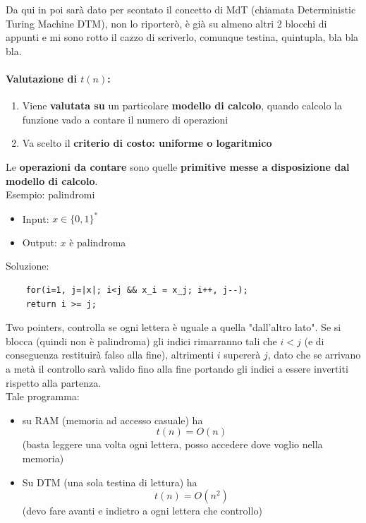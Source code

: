 Da qui in poi sarà dato per scontato il concetto di MdT (chiamata Deterministic Turing Machine DTM), non lo riporterò, è già su almeno altri 2 blocchi di appunti e mi sono rotto il cazzo di scriverlo, comunque testina, quintupla, bla bla bla.\\

\newpage

\paragraph{Valutazione di $t(n)$:}
\begin{enumerate}
	\item Viene \textbf{valutata su} un particolare \textbf{modello di calcolo}, quando calcolo la funzione vado a contare il numero di operazioni
	\item Va scelto il \textbf{criterio di costo: uniforme o logaritmico}
\end{enumerate} 

Le \textbf{operazioni da contare} sono quelle \textbf{primitive messe a disposizione dal modello di calcolo}. \\
Esempio: palindromi
\begin{itemize}
	\item Input: $x \in \{0,1\}^\ast$
	\item Output: $x$ è palindroma
\end{itemize}
Soluzione: 
\begin{lstlisting}
	for(i=1, j=|x|; i<j && x_i = x_j; i++, j--);
	return i >= j;
\end{lstlisting}

Two pointers, controlla se ogni lettera è uguale a quella "dall'altro lato". Se si blocca (quindi non è palindroma) gli indici rimarranno tali che $i < j$ (e di conseguenza restituirà falso alla fine), altrimenti $i$ supererà $j$, dato che se arrivano a metà il controllo sarà valido fino alla fine portando gli indici a essere invertiti rispetto alla partenza.\\

Tale programma: 
\begin{itemize}
	\item su RAM (memoria ad accesso casuale) ha 
	$$ t(n) = O(n) $$
	(basta leggere una volta ogni lettera, posso accedere dove voglio nella memoria)
	\item Su DTM (una sola testina di lettura) ha 
	$$ t(n) = O(n^2) $$
	(devo fare avanti e indietro a ogni lettera che controllo)
\end{itemize}

